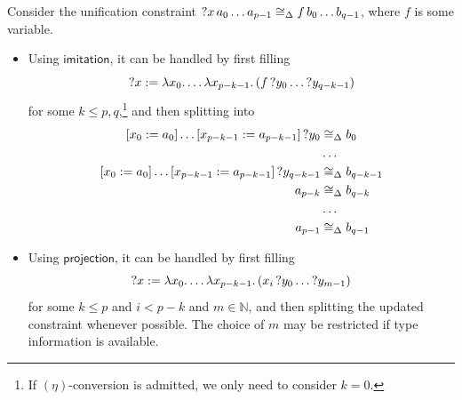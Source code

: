 \documentclass[twoside]{report}
\begin{document}
\begin{example}
    Consider the unification constraint ${{{?x}\,{a_0}}\,{\ldots}}\,{a_{p-1}} \cong_\Delta {{{f}\,{b_0}}\,{\ldots}}\,{b_{q-1}}$, where $f$ is some variable.

    \begin{itemize}
        \item Using $\mathsf{imitation}$, it can be handled by first filling
              $$
                  {?x} :=
                  \lambda{x_0}.\,{\ldots \lambda{x_{p-k-1}}.\,{
                          ({{f}\,{?y_0}}\,{\ldots {?y_{q-k-1}}})
                      }}
              $$
              for some $k \leq p,q$,\footnote{If $(\eta)$-conversion is admitted, we only need to consider $k = 0$.} and then splitting into
              $$
                  \begin{aligned}
                      \llet {x_0} {a_0} {\ldots \llet {x_{p-k-1}} {a_{p-k-1}} {?y_0}}       & \cong_\Delta b_0       \\
                                                                                            & \ldots                 \\
                      \llet {x_0} {a_0} {\ldots \llet {x_{p-k-1}} {a_{p-k-1}} {?y_{q-k-1}}} & \cong_\Delta b_{q-k-1} \\
                      a_{p-k}                                                               & \cong_\Delta b_{q-k}   \\
                                                                                            & \ldots                 \\
                      a_{p-1}                                                               & \cong_\Delta b_{q-1}   \\
                  \end{aligned}
              $$

        \item Using $\mathsf{projection}$, it can be handled by first filling
              $$
                  {?x} :=
                  \lambda{x_0}.\,{\ldots \lambda{x_{p-k-1}}.\,{
                          ({{x_i}\,{?y_0}}\,{\ldots {?y_{m-1}}})
                      }}
              $$
              for some $k \leq p$ and $i < p - k$ and $m \in \mathbb N$, and then splitting the updated constraint whenever possible. The choice of $m$ may be restricted if type information is available.
    \end{itemize}
\end{example}
\end{document}
